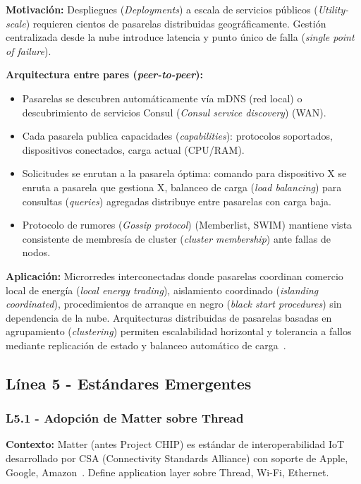 \textbf{Motivación:} Despliegues (\textit{Deployments}) a escala de servicios públicos (\textit{Utility-scale}) requieren cientos de pasarelas distribuidas geográficamente. Gestión centralizada desde la nube introduce latencia y punto único de falla (\textit{single point of failure}).

\textbf{Arquitectura entre pares (\textit{peer-to-peer}):}
\begin{itemize}
\item Pasarelas se descubren automáticamente vía mDNS (red local) o descubrimiento de servicios Consul (\textit{Consul service discovery}) (WAN).
\item Cada pasarela publica capacidades (\textit{capabilities}): protocolos soportados, dispositivos conectados, carga actual (CPU/RAM).
\item Solicitudes se enrutan a la pasarela óptima: comando para dispositivo X se enruta a pasarela que gestiona X, balanceo de carga (\textit{load balancing}) para consultas (\textit{queries}) agregadas distribuye entre pasarelas con carga baja.
\item Protocolo de rumores (\textit{Gossip protocol}) (Memberlist, SWIM) mantiene vista consistente de membresía de cluster (\textit{cluster membership}) ante fallas de nodos.
\end{itemize}

\textbf{Aplicación:} Microrredes interconectadas donde pasarelas coordinan comercio local de energía (\textit{local energy trading}), aislamiento coordinado (\textit{islanding coordinated}), procedimientos de arranque en negro (\textit{black start procedures}) sin dependencia de la nube. Arquitecturas distribuidas de pasarelas basadas en agrupamiento (\textit{clustering}) permiten escalabilidad horizontal y tolerancia a fallos mediante replicación de estado y balanceo automático de carga~\cite{effahHardwareEvaluationClusterBased2024}.

\subsection{Línea 5 - Estándares Emergentes}

\subsubsection{L5.1 - Adopción de Matter sobre Thread}

\textbf{Contexto:} Matter (antes Project CHIP) es estándar de interoperabilidad IoT desarrollado por CSA (Connectivity Standards Alliance) con soporte de Apple, Google, Amazon~\cite{shahinzadehSmartHomeConnectivity2024}. Define application layer sobre Thread, Wi-Fi, Ethernet.

